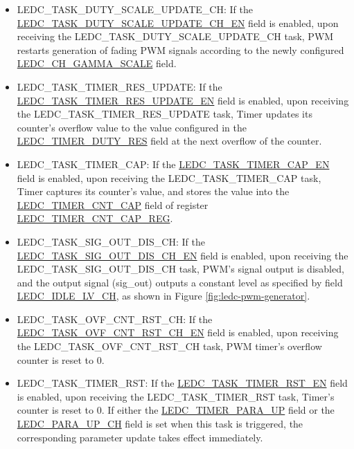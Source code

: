 \documentclass[main\_\_EN.tex]{subfiles}
\begin{document}
\begin{itemize}
\item LEDC\_TASK\_DUTY\_SCALE\_UPDATE\_CH: If the \hyperref[fielddesc:LEDCTASKDUTYSCALEUPDATECHNEN]{LEDC\_TASK\_DUTY\_SCALE\_UPDATE\_CH\_EN} field is enabled, upon receiving the LEDC\_TASK\_DUTY\_SCALE\_UPDATE\_CH task, PWM restarts generation of fading PWM signals according to the newly configured \hyperref[fielddesc:LEDCCHNGAMMASCALE]{LEDC\_CH\_GAMMA\_SCALE} field.
\item LEDC\_TASK\_TIMER\_RES\_UPDATE: If the \hyperref[fielddesc:LEDCTASKTIMERXRESUPDATEEN]{LEDC\_TASK\_TIMER\_RES\_UPDATE\_EN} field is enabled, upon receiving the LEDC\_TASK\_TIMER\_RES\_UPDATE task, Timer updates its counter's overflow value to the value configured in the \hyperref[fielddesc:LEDCTIMERXDUTYRES]{LEDC\_TIMER\_DUTY\_RES} field at the next overflow of the counter.
\item LEDC\_TASK\_TIMER\_CAP: If the \hyperref[fielddesc:LEDCTASKTIMERXCAPEN]{LEDC\_TASK\_TIMER\_CAP\_EN} field is enabled, upon receiving the LEDC\_TASK\_TIMER\_CAP task, Timer captures its counter's value, and stores the value into the \hyperref[fielddesc:LEDCTIMERXCNTCAP]{LEDC\_TIMER\_CNT\_CAP} field of register \hyperref[regdesc:LEDCTIMERXCNTCAPREG]{LEDC\_TIMER\_CNT\_CAP\_REG}.
\item LEDC\_TASK\_SIG\_OUT\_DIS\_CH: If the \hyperref[fielddesc:LEDCTASKSIGOUTDISCHNEN]{LEDC\_TASK\_SIG\_OUT\_DIS\_CH\_EN} field is enabled, upon receiving the LEDC\_TASK\_SIG\_OUT\_DIS\_CH task, PWM's signal output is disabled, and the output signal (sig\_out) outputs a constant level as specified by field \hyperref[fielddesc:LEDCIDLELVCHN]{LEDC\_IDLE\_LV\_CH}, as shown in Figure \ref{fig:ledc-pwm-generator}.
\item LEDC\_TASK\_OVF\_CNT\_RST\_CH: If the \hyperref[fielddesc:LEDCTASKOVFCNTRSTCHNEN]{LEDC\_TASK\_OVF\_CNT\_RST\_CH\_EN} field is enabled, upon receiving the LEDC\_TASK\_OVF\_CNT\_RST\_CH task, PWM timer's overflow counter is reset to 0.
\item LEDC\_TASK\_TIMER\_RST: If the \hyperref[fielddesc:LEDCTASKTIMERXRSTEN]{LEDC\_TASK\_TIMER\_RST\_EN} field is enabled, upon receiving the LEDC\_TASK\_TIMER\_RST task, Timer's counter is reset to 0. If either the \hyperref[fielddesc:LEDCTIMERXPARAUP]{LEDC\_TIMER\_PARA\_UP} field or the \hyperref[fielddesc:LEDCPARAUPCHN]{LEDC\_PARA\_UP\_CH} field is set when this task is triggered, the corresponding parameter update takes effect immediately.

\end{itemize}
\end{document}

